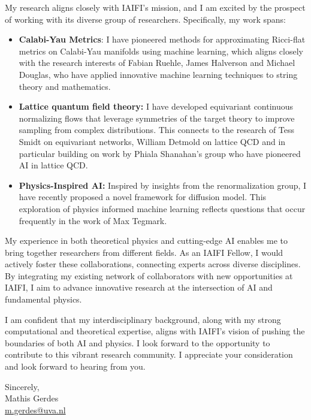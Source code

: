 \documentclass[11pt]{article}
\begin{document}
My research aligns closely with IAIFI's mission, and I am excited by the prospect of working with its diverse group of researchers. Specifically, my work spans:
\begin{itemize}
    \item \textbf{Calabi-Yau Metrics}: I have pioneered methods for approximating Ricci-flat metrics on Calabi-Yau manifolds using machine learning, which aligns closely with the research interests of Fabian Ruehle, James Halverson and Michael Douglas, who have applied innovative machine learning techniques to string theory and mathematics.
    \item \textbf{Lattice quantum field theory:} I have developed equivariant continuous normalizing flows that leverage symmetries of the target theory to improve sampling from complex distributions. This connects to the research of Tess Smidt on equivariant networks, William Detmold on lattice QCD and in particular building on work by Phiala Shanahan's group who have pioneered AI in lattice QCD.
    \item \textbf{Physics-Inspired AI:} Inspired by insights from the renormalization group, I have recently proposed a novel framework for diffusion model.
    This exploration of physics informed machine learning reflects questions that occur frequently in the work of Max Tegmark.
\end{itemize}


My experience in both theoretical physics and cutting-edge AI enables me to bring together researchers from different fields. As an IAIFI Fellow, I would actively foster these collaborations, connecting experts across diverse disciplines. By integrating my existing network of collaborators with new opportunities at IAIFI, I aim to advance innovative research at the intersection of AI and fundamental physics.

I am confident that my interdisciplinary background, along with my strong computational and theoretical expertise, aligns with IAIFI's vision of pushing the boundaries of both AI and physics. I look forward to the opportunity to contribute to this vibrant research community. I appreciate your consideration and look forward to hearing from you.

\vspace{10pt}
\noindent
\flushright
Sincerely, \\
Mathis Gerdes \\
\href{mailto:m.gerdes@uva.nl}{m.gerdes@uva.nl}
\end{document}

